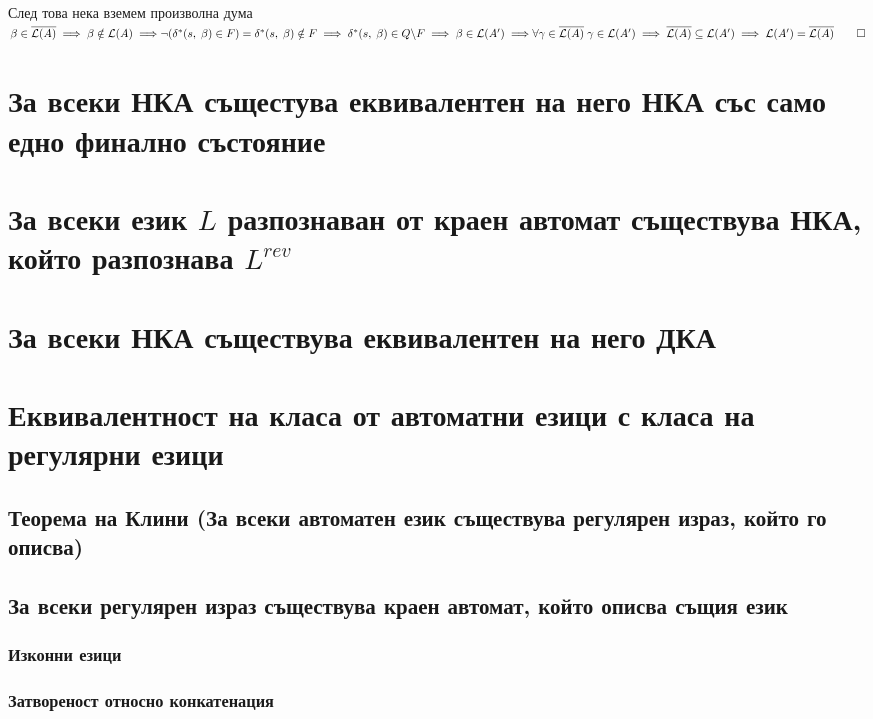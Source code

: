 \documentclass[12pt]{article}
\newcommand{\Lang}{\mathcal{L}}
\begin{document}
След това нека вземем произволна дума $\beta \in \overline{\Lang(A)} \implies \beta \notin \Lang(A) \implies \\\\
\lnot(\delta^*(s, \; \beta) \in F) = \delta^*(s, \; \beta) \notin F \implies \delta^*(s, \; \beta) \in Q \backslash F \implies \beta \in \Lang(A') \implies \\\\
\forall \gamma \in \overline{\Lang(A)} \; \gamma \in \Lang(A') \implies \overline{\Lang(A)} \subseteq \Lang(A') \implies \Lang(A') = \overline{\Lang(A)} \qed$

\section{За всеки НКА същестува еквивалентен на него НКА със само едно финално състояние}

\section{За всеки език $L$ разпознаван от краен автомат съществува НКА, който разпознава $L^{rev}$}

\section{За всеки НКА съществува еквивалентен на него ДКА}

\section{Еквивалентност на класа от автоматни езици с класа на регулярни езици}

\subsection{Теорема на Клини (За всеки автоматен език съществува регулярен израз, който го описва)}

\subsection{За всеки регулярен израз съществува краен автомат, който описва същия език}

\subsubsection{Изконни езици}

\subsubsection{Затвореност относно конкатенация}
\end{document}
